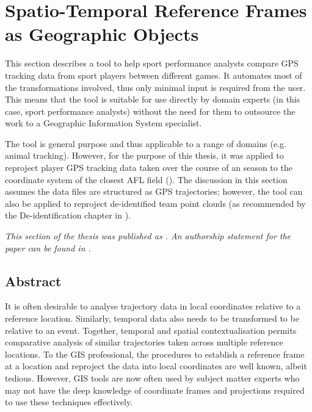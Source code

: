 
\section{Spatio-Temporal Reference Frames as Geographic Objects} \label{sec:Simmons2017}


This section describes a tool to help sport performance analysts compare GPS tracking data from sport players between different games. It automates most of the transformations
involved, thus only minimal input is required from the user. This means
that the tool is suitable for use directly by domain experts (in this
case, sport performance analysts) without the need for them to
outsource the work to a Geographic Information System specialist.

The tool is general purpose and thus applicable to a range of domains (e.g. animal tracking). However, for the purpose of this thesis, it was applied to reproject player GPS tracking data taken over the course of an \afl{} season to the coordinate system of the closest AFL field (). The discussion in this section assumes the data files are structured as GPS trajectories; however, the tool can also be applied to reproject de-identified team point clouds (as recommended by the De-identification chapter in ).


\pagebreak{}

\textit{This section of the thesis was published as . An authorship statement for the paper can be found in .}

\subsection{Abstract}

It is often desirable to analyse trajectory data in local coordinates relative to a reference location. Similarly, temporal data also needs to be transformed to be relative to an event. Together, temporal and spatial contextualisation permits comparative analysis of similar trajectories taken across multiple reference locations. To the GIS professional, the procedures to establish a reference frame at a location and reproject the data into local coordinates are well known, albeit tedious. However, GIS tools are now often used by subject matter experts who may not have the deep knowledge of coordinate frames and projections required to use these techniques effectively.

